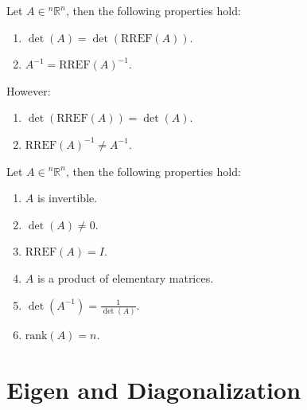 \documentclass[11pt]{article}
\begin{document}
\begin{theorem}
    Let $A \in  {^n\mathbb{R}^n}$, then the following properties hold:
    \begin{enumerate}
        \item $\det(A) = \det(\text{RREF}(A))$.
        \item $A^{-1} = \text{RREF}(A)^{-1}$.
    \end{enumerate}
    However:
    \begin{enumerate}
        \item $\det(\text{RREF}(A)) = \det(A)$.
        \item $\text{RREF}(A)^{-1} \neq A^{-1}$.
    \end{enumerate} 
    
\end{theorem}
\begin{theorem}
    Let $A \in  {^n\mathbb{R}^n}$, then the following properties hold:
    \begin{enumerate}
        \item $A$ is invertible.
        \item $\det(A) \neq 0$.
        \item $\text{RREF}(A) = I$.
        \item $A$ is a product of elementary matrices.
        \item $\det(A^{-1}) = \frac{1}{\det(A)}$.
        \item $\text{rank}(A) = n$.
    \end{enumerate}
\end{theorem}
\section{Eigen and Diagonalization}
\end{document}
